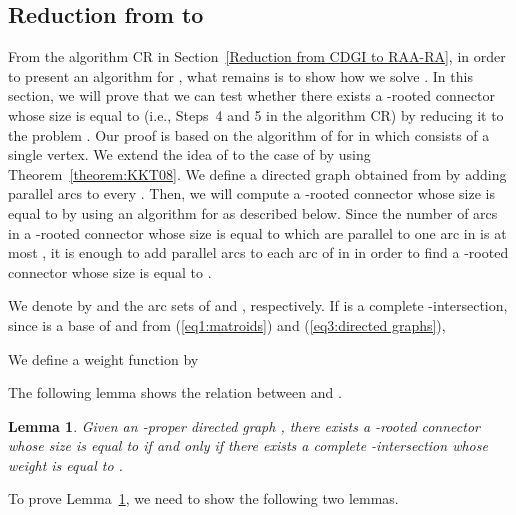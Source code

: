 \documentclass[11pt]{article}
\newcounter{ni}
\theoremstyle{plain}
\newtheorem{lemma}[theorem]{Lemma}\newtheorem{corollary}[theorem]{Corollary}\newtheorem{definition}[theorem]{Definition}\newtheorem{proposition}[theorem]{Proposition}\newtheorem{claim}[theorem]{Claim}\newtheorem{fact}[theorem]{Fact}\newtheorem{example}{Example}
\begin{document}
\subsection{Reduction from  to }

From the algorithm {\sf CR} in Section~\ref{Reduction from CDGI to RAA-RA},
in order 
to present an algorithm for , what remains is to 
show how we solve . 
In this section, we will prove that we can test whether there exists 
a -rooted connector whose size is equal to  
(i.e., Steps~4 and 5 in the algorithm {\sf CR}) 
by reducing it to the problem . 
Our proof is based on the algorithm of \cite{F06} for 
 in which  consists of a single vertex.
We extend the idea of \cite{F06} to the case of 
 by using Theorem~\ref{theorem:KKT08}.  
We define a directed graph  obtained from  by adding  parallel arcs to every 
. 
Then, we will compute a -rooted connector whose size is equal to  
by using an algorithm for 
as described below. 
Since the number of arcs in a -rooted connector whose size is equal to  
which are parallel to one arc in  
is at most , it is enough to add  parallel arcs to 
each arc of  in  in order to find a -rooted connector whose size 
is equal to . 

We denote by  and  the arc sets of  and , respectively. 
If  is a complete 
-intersection, 
since  is a base of  and 
from (\ref{eq1:matroids}) and (\ref{eq3:directed graphs}),  

We define a weight function  by  

The following lemma shows the relation between  and . 
\begin{lemma} \label{lemma2:wmi}
Given an -proper directed graph  , 
there exists a -rooted connector whose size is equal to 
if and only if 
there exists a complete -intersection whose weight is equal to .
\end{lemma}
To prove Lemma~\ref{lemma2:wmi}, we need to show the following two lemmas.
\end{document}
